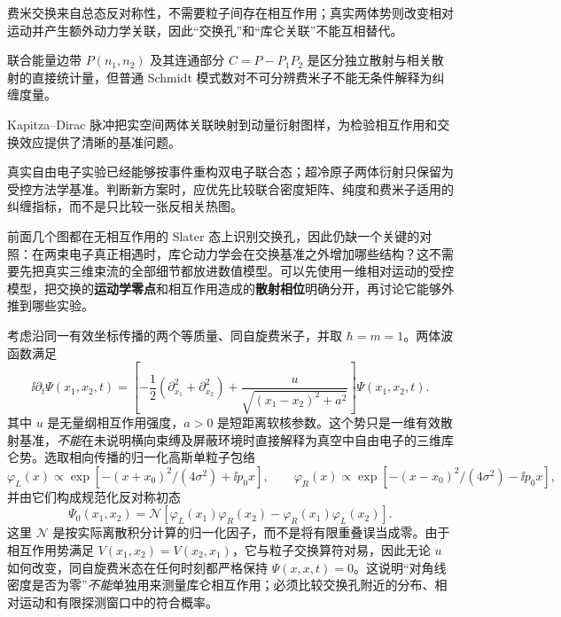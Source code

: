 \medskip
费米交换来自总态反对称性，不需要粒子间存在相互作用；真实两体势则改变相对运动并产生额外动力学关联，因此“交换孔”和“库仑关联”不能互相替代。

联合能量边带 $P(n_1,n_2)$ 及其连通部分 $C=P-P_1P_2$ 是区分独立散射与相关散射的直接统计量，但普通 Schmidt 模式数对不可分辨费米子不能无条件解释为纠缠度量。

Kapitza--Dirac 脉冲把实空间两体关联映射到动量衍射图样，为检验相互作用和交换效应提供了清晰的基准问题。

真实自由电子实验已经能够按事件重构双电子联合态；超冷原子两体衍射只保留为受控方法学基准。判断新方案时，应优先比较联合密度矩阵、纯度和费米子适用的纠缠指标，而不是只比较一张反相关热图。


前面几个图都在无相互作用的 Slater 态上识别交换孔，因此仍缺一个关键的对照：在两束电子真正相遇时，库仑动力学会在交换基准之外增加哪些结构？这不需要先把真实三维束流的全部细节都放进数值模型。可以先使用一维相对运动的受控模型，把交换的\textbf{运动学零点}和相互作用造成的\textbf{散射相位}明确分开，再讨论它能够外推到哪些实验。

考虑沿同一有效坐标传播的两个等质量、同自旋费米子，并取 $\hbar=m=1$。两体波函数满足
\begin{equation}
\ii\partial_t\Psi(x_1,x_2,t)=\left[-\frac12(\partial_{x_1}^2+\partial_{x_2}^2)
+\frac{u}{\sqrt{(x_1-x_2)^2+a^2}}\right]\Psi(x_1,x_2,t).
\label{eq:ch06-soft-coulomb}
\end{equation}
其中 $u$ 是无量纲相互作用强度，$a>0$ 是短距离软核参数。这个势只是一维有效散射基准，\emph{不能}在未说明横向束缚及屏蔽环境时直接解释为真空中自由电子的三维库仑势。选取相向传播的归一化高斯单粒子包络
\begin{equation}
\varphi_L(x)\propto\exp[-(x+x_0)^2/(4\sigma^2)+\ii p_0x],\qquad
\varphi_R(x)\propto\exp[-(x-x_0)^2/(4\sigma^2)-\ii p_0x],
\label{eq:ch06-collision-packets}
\end{equation}
并由它们构成规范化反对称初态
\begin{equation}
\Psi_0(x_1,x_2)=\mathcal N
[\varphi_L(x_1)\varphi_R(x_2)-\varphi_R(x_1)\varphi_L(x_2)].
\label{eq:ch06-collision-initial}
\end{equation}
这里 $\mathcal N$ 是按实际离散积分计算的归一化因子，而不是将有限重叠误当成零。由于相互作用势满足 $V(x_1,x_2)=V(x_2,x_1)$，它与粒子交换算符对易，因此无论 $u$ 如何改变，同自旋费米态在任何时刻都严格保持 $\Psi(x,x,t)=0$。这说明“对角线密度是否为零”\emph{不能}单独用来测量库仑相互作用；必须比较交换孔附近的分布、相对运动和有限探测窗口中的符合概率。

